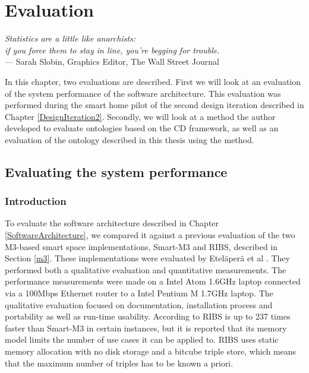\chapter{Evaluation}
\label{Evaluation}

\begin{flushright}{\slshape    
Statistics are a little like anarchists: \\
if you force them to stay in line, you're begging for trouble.} \\ \medskip
    --- Sarah Slobin, Graphics Editor, The Wall Street Journal
\end{flushright}


In this chapter, two evaluations are described. First we will look at an evaluation of the system performance of the software architecture. This evaluation was performed during the smart home pilot of the second design iteration described in Chapter \ref{DesignIteration2}. Secondly, we will look at a method the author developed to evaluate ontologies based on the \ac{CD} framework, as well as an evaluation of the ontology described in this thesis using the method.

\section{Evaluating the system performance}
\label{performance}
\subsection{Introduction}

To evaluate the software architecture described in Chapter \ref{SoftwareArchitecture}, we compared it against a previous evaluation of the two M3-based smart space implementations, Smart-M3 and \ac{RIBS}, described in Section \ref{m3}. These implementations were evaluated by Etel\"aper\"a et al \cite{Etelapera2011}. They performed both a qualitative evaluation and quantitative measurements. The performance measurements were made on a Intel Atom 1.6GHz laptop connected via a 100Mbps Ethernet router to a Intel Pentium M 1.7GHz laptop. The qualitative evaluation focused on documentation, installation process and portability as well as run-time usability. According to \cite{Etelapera2011} \ac{RIBS} is up to 237 times faster than Smart-M3 in certain instances, but it is reported that its memory model limits the number of use cases it can be applied to. \ac{RIBS} uses static memory allocation with no disk storage and a bitcube triple store, which means that the maximum number of triples has to be known a priori.

